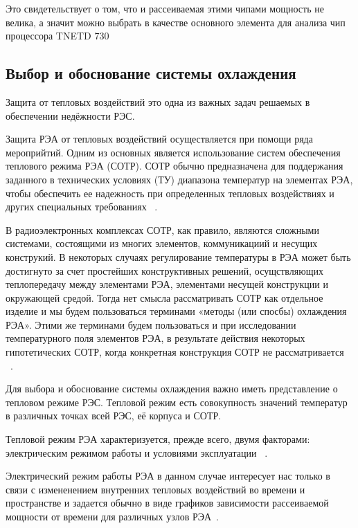 Это свидетельствует о том, что и рассеиваемая этими чипами мощность не
велика, а значит можно выбрать в качестве основного элемента для
анализа чип процессора TNETD 730


\subsection{Выбор и обоснование системы охлаждения}

Защита от тепловых воздействий это одна из важных задач решаемых в обеспечении недёжности РЭС.

Защита РЭА от тепловых воздействий осуществляется при помощи ряда
мероприйтий. Одним из основных является использование систем
обеспечения теплового режима РЭА (СОТР). СОТР обычно предназначена для
поддержания заданного в технических условиях (ТУ) диапазона температур
на элементах РЭА, чтобы обеспечить ее надежность при определенных
тепловых воздействиях и других специальных требованиях ~\cite{Rotkop1976}.

В радиоэлектронных комплексах СОТР, как правило, являются сложными
системами, состоящими из многих элементов, коммуникациий и несущих
конструкий. В некоторых случаях регулирование температуры в РЭА может
быть достигнуто за счет простейших конструктивных решений,
осущствляющих теплопередачу между элементами РЭА, элементами несущей
конструкции и окружающей средой. Тогда нет смысла рассматривать СОТР
как отдельное изделие и мы будем пользоваться терминами «методы (или
спосбы) охлаждения РЭА». Этими же терминами будем пользоваться и при
исследовании температурного поля элементов РЭА, в результате действия
некоторых гипотетических СОТР, когда конкретная конструкция СОТР не
рассматривается ~\cite{Rotkop1976}.

Для выбора и обоснование системы охлаждения важно иметь представление
о тепловом режиме РЭС.  Тепловой режим есть совокупность значений
температур в различных точках всей РЭС, её корпуса и СОТР.

Тепловой режим РЭА характеризуется, прежде всего, двумя факторами:
электрическим режимом работы и условиями эксплуатации ~\cite{Rotkop1976}.

Электрический режим работы РЭА в данном случае интересует нас только в
связи с измененением внутренних тепловых воздействий во времени и
пространстве и задается обычно в виде графиков зависимости
рассеиваемой мощности от времени для различных узлов РЭА~\cite{Rotkop1976}.



